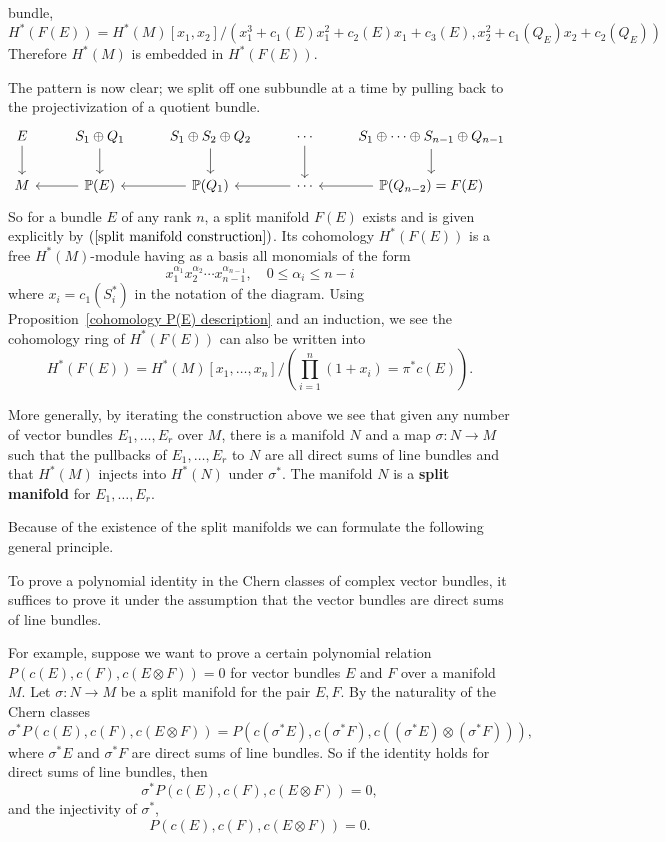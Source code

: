 bundle,
\[H^*(F(E))=H^*(M)[x_1,x_2]/(x_1^3+c_1(E)x_1^2+c_2(E)x_1+c_3(E),x_2^2+c_1(Q_E)x_2+c_2(Q_E))\]
Therefore $H^*(M)$ is embedded in $H^*(F(E))$.\par
The pattern is now clear; we split off one subbundle at a time by pulling back to the projectivization of a quotient bundle.
\begin{equation}\label{split manifold construction}
\begin{tikzcd}
E\ar[d]&S_1\oplus Q_1\ar[d]&S_1\oplus S_{2}\oplus Q_{2}\ar[d]&\cdots\ar[d]&S_1\oplus\cdots\oplus S_{n-1}\oplus Q_{n-1}\ar[d]\\
M&\mathbb{P}(E)\ar[l]&\mathbb{P}(Q_1)\ar[l]&\cdots\ar[l]&\mathbb{P}(Q_{n-2})=F(E)\ar[l]
\end{tikzcd}
\end{equation}
So for a bundle $E$ of any rank $n$, a split manifold $F(E)$ exists and is given explicitly by $(\ref{split manifold construction})$. Its cohomology $H^*(F(E))$ is a 
free $H^*(M)$-module having as a basis all monomials of the form
\[x_1^{\alpha_1}x_2^{\alpha_2}\cdots x_{n-1}^{\alpha_{n-1}},\quad 0\leq\alpha_i\leq n-i\]
where $x_i=c_1(S_i^*)$ in the notation of the diagram. Using Proposition~\ref{cohomology P(E) description} and an induction, we see the cohomology ring of 
$H^*(F(E))$ can also be written into
\[H^*(F(E))=H^*(M)[x_1,\dots,x_n]/(\prod_{i=1}^{n}(1+x_i)=\pi^*c(E)).\]

More generally, by iterating the construction above we see that given any number of vector bundles $E_1,\dots,E_r$ over $M$, there is a manifold $N$ and a map $\sigma:N\to M$ 
such that the pullbacks of $E_1,\dots,E_r$ to $N$ are all direct sums of line bundles and that $H^*(M)$ injects into $H^*(N)$ under $\sigma^*$. The manifold $N$ is a 
\textbf{split manifold} for $E_1,\dots,E_r$.\par
Because of the existence of the split manifolds we can formulate the following general principle.
\begin{proposition}
To prove a polynomial identity in the Chern classes of complex vector bundles, it suffices to prove it under the assumption that the vector bundles are direct sums of 
line bundles.
\end{proposition}
For example, suppose we want to prove a certain polynomial relation $P(c(E),c(F),c(E\otimes F))=0$ for vector bundles $E$ and $F$ over a manifold $M$. Let $\sigma:N\to M$ 
be a split manifold for the pair $E,F$. By the naturality of the Chern classes
\[\sigma^*P(c(E),c(F),c(E\otimes F))=P(c(\sigma^*E),c(\sigma^*F),c((\sigma^*E)\otimes(\sigma^*F))),\]
where $\sigma^*E$ and $\sigma^*F$ are direct sums of line bundles. So if the identity holds for direct sums of line bundles, then
\[\sigma^*P(c(E),c(F),c(E\otimes F))=0,\]
and the injectivity of $\sigma^*$,
\[P(c(E),c(F),c(E\otimes F))=0.\]
